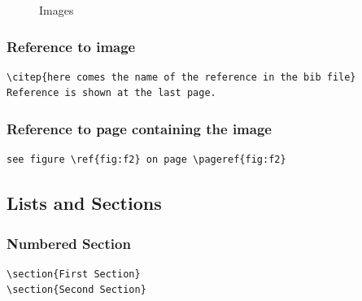 \begin{figure}[h!]
  \centering
  \hfill %
  \caption{Images}
  \citep{stackexchange}
\end{figure}

\subsubsection{Reference to image}
\begin{verbatim}
\citep{here comes the name of the reference in the bib file}
Reference is shown at the last page.
\end{verbatim}

\subsubsection{Reference to page containing the image}
\begin{verbatim}
see figure \ref{fig:f2} on page \pageref{fig:f2}
\end{verbatim}

\clearpage

\subsection{Lists and Sections}

\subsubsection{Numbered Section}
\begin{verbatim}
\section{First Section}
\section{Second Section}
\end{verbatim}



